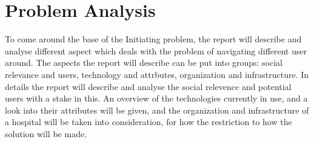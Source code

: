 \chapter{Problem Analysis} \label{cha:problem_analysis}

To come around the base of the Initiating problem, the report will describe and analyse different aspect which deals with the problem of navigating different user around. The aspects the report will describe can be put into groups: social relevance and users, technology and attrbutes, organization and infrastructure. In details the report will describe and analyse the social relevence and potential users with a stake in this. An overview of the technologies currently in use, and a look into their attributes will be given, and the organization and infrastructure of a hospital will be taken into consideration, for how the restriction to how the solution will be made. 












